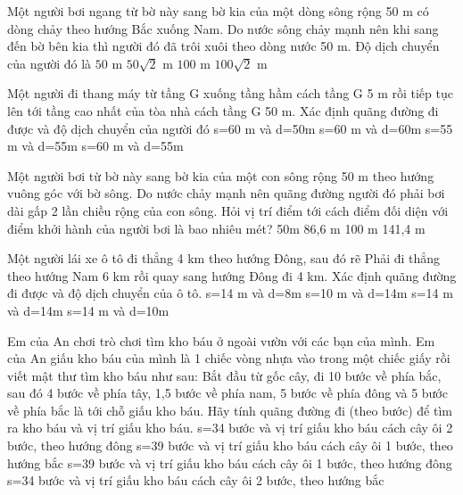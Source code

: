 \documentclass[Main.tex]{subfiles}
\begin{document}
			\begin{ex}
				[VD] Một người bơi ngang từ bờ này sang bờ kia của một dòng sông rộng 50 m có dòng chảy theo hướng Bắc xuống Nam. Do nước sông chảy mạnh nên khi sang đến bờ bên kia thì người đó đã trôi xuôi theo dòng nước 50 m. Độ dịch chuyển của người đó là
				\choice
				{$50$ m}
				{$50\sqrt{2}$ m}
				{$100$ m}
				{$100\sqrt{2}$ m}
				\loigiai{}
			\end{ex}
			
			\begin{ex}
				[VD] Một người đi thang máy từ tầng G xuống tầng hầm cách tầng G 5 m rồi tiếp tục lên tới tầng cao nhất của tòa nhà cách tầng G 50 m. Xác định quãng đường đi được và độ dịch chuyển của người đó
				\choice
				{s=60 m và d=50m}
				{s=60 m và d=60m}
				{s=55 m và d=55m}
				{s=60 m và d=55m}
				\loigiai{}
			\end{ex}
			
			\begin{ex}
				[VDC] Một người bơi từ bờ này sang bờ kia của một con sông rộng 50 m theo hướng vuông góc với bờ sông. Do nước chảy mạnh nên quãng đường người đó phải bơi dài gấp 2 lần chiều rộng của con sông. Hỏi vị trí điểm tới cách điểm đối diện với điểm khởi hành của người bơi là bao nhiêu mét?
				\choice
				{50m}
				{86,6 m}
				{100 m}
				{141,4 m}
				\loigiai{}
			\end{ex}
			
			\begin{ex}
				[VDC] Một người lái xe ô tô đi thẳng 4 km theo hướng Đông, sau đó rẽ Phải đi thẳng theo hướng Nam 6 km rồi quay sang hướng Đông đi 4 km. Xác định quãng đường đi được và độ dịch chuyển của ô tô.
				\choice
				{s=14 m và d=8m}
				{s=10 m và d=14m}
				{s=14 m và d=14m}
				{s=14 m và d=10m}
				\loigiai{}
			\end{ex}
			
			\begin{ex}
				[VDC] Em của An chơi trò chơi tìm kho báu ở ngoài vườn với các bạn của mình. Em của An giấu kho báu của mình là 1 chiếc vòng nhựa vào trong một chiếc giấy rồi viết mật thư tìm kho báu như sau: Bắt đầu từ gốc cây, đi 10 bước về phía bắc, sau đó 4 bước về phía tây, 1,5 bước về phía nam, 5 bước về phía đông và 5 bước về phía bắc là tới chỗ giấu kho báu. Hãy tính quãng đường đi (theo bước) để tìm ra kho báu và vị trí giấu kho báu.
				\choice
				{s=34 bước và vị trí giấu kho báu cách cây ôi 2 bước, theo hướng đông}
				{s=39 bước và vị trí giấu kho báu cách cây ôi 1 bước, theo hướng bắc}
				{s=39 bước và vị trí giấu kho báu cách cây ôi 1 bước, theo hướng đông}
				{s=34 bước và vị trí giấu kho báu cách cây ôi 2 bước, theo hướng bắc}
				\loigiai{}
			\end{ex}
\end{document}
